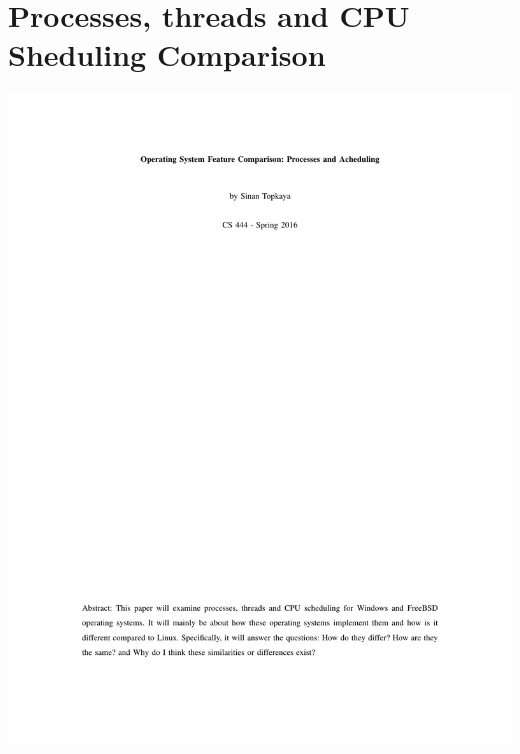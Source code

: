 \documentclass[letterpaper,10pt,draftclsnofoot,onecolumn]{IEEEtran}
\begin{document}
\appendix
\section{Processes, threads and CPU Sheduling Comparison}\label{AppendixA}
\includegraphics{writing1.pdf}




\end{document}
